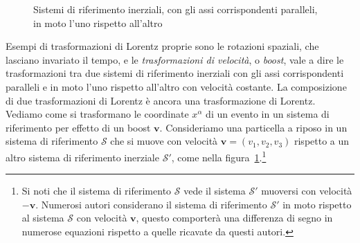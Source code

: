 \begin{figure}
  \centering
  \caption[Sistemi di riferimento inerziali in moto l'uno rispetto
  all'altro]{Sistemi di riferimento inerziali, con gli assi corrispondenti
    paralleli, in moto l'uno rispetto all'altro}
  \label{fig:trasformazioni-lorentz}
\end{figure}
Esempi di trasformazioni di Lorentz proprie sono le rotazioni spaziali, che
lasciano invariato il tempo, e le \emph{trasformazioni di velocità}, o
\emph{boost}, vale a dire le trasformazioni tra due sistemi di
riferimento inerziali con gli assi corrispondenti paralleli e in moto l'uno
rispetto all'altro con velocità costante.
La composizione di due trasformazioni di Lorentz è ancora una
trasformazione di Lorentz.
Vediamo come si trasformano le coordinate $x^{\alpha}$ di un evento in un
sistema di riferimento per effetto di un boost $\bm{v}$.  Consideriamo una
particella a riposo in un sistema di riferimento $\mathcal{S}$ che si muove con
velocità $\bm{v} = (v_{1},v_{2},v_{3})$ rispetto a un altro sistema di
riferimento inerziale $\mathcal{S}'$, come nella
figura~\ref{fig:trasformazioni-lorentz}.\footnote{Si noti che il sistema di
  riferimento $\mathcal{S}$ vede il sistema $\mathcal{S}'$ muoversi con velocità
  $-\bm{v}$.  Numerosi autori considerano il sistema di riferimento
  $\mathcal{S}'$ in moto rispetto al sistema $\mathcal{S}$ con velocità
  $\bm{v}$, questo comporterà una differenza di segno in numerose equazioni
  rispetto a quelle ricavate da questi autori.}
